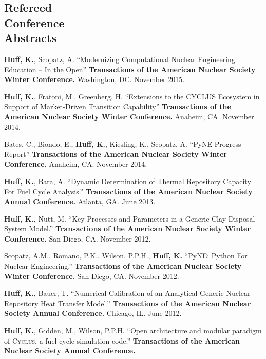 \documentclass[margin,line]{resume}
\newcommand{\Cyclus}{\textsc{Cyclus}\xspace}%
\begin{document}
\begin{resume}
    \section{\mysidestyle Refereed\\Conference\\Abstracts}
    \begin{bibenum}
      \item \textbf{Huff, K.}, Scopatz, A. ``Modernizing Computational Nuclear Engineering Education -- In the Open''
         \textbf{Transactions of the American Nuclear Society Winter Conference.}
         Washington, DC. November 2015.
      \item \textbf{Huff, K.}, Fratoni, M., Greenberg, H. ``Extensions to the CYCLUS Ecosystem in Support of Market-Driven Transition Capability''
         \textbf{Transactions of the American Nuclear Society Winter Conference.}
         Anaheim, CA. November 2014.
      \item Bates, C., Biondo, E., \textbf{Huff, K.}, Kiesling, K., Scopatz, A. ``PyNE Progress Report''
         \textbf{Transactions of the American Nuclear Society Winter Conference.}
         Anaheim, CA. November 2014.
      \item \textbf{Huff, K.}, Bara, A. ``Dynamic Determination of Thermal Repository Capacity For Fuel Cycle Analysis.''
         \textbf{Transactions of the American Nuclear Society Annual Conference.}
         Atlanta, GA. June 2013.
      \item \textbf{Huff, K.}, Nutt, M. ``Key Processes and Parameters in a Generic Clay Disposal System Model.''
         \textbf{Transactions of the American Nuclear Society Winter Conference.}
        San Diego, CA. November 2012.
      \item Scopatz, A.M., Romano, P.K., Wilson, P.P.H., \textbf{Huff, K.} ``PyNE: Python For Nuclear Engineering.''
         \textbf{Transactions of the American Nuclear Society Winter Conference.}
        San Diego, CA. November 2012.
      \item \textbf{Huff, K.}, Bauer, T. ``Numerical Calibration of an Analytical Generic Nuclear Repository Heat Transfer Model.''
         \textbf{Transactions of the American Nuclear Society Annual Conference.}
        Chicago, IL. June 2012.
      \item \textbf{Huff, K.}, Gidden, M., Wilson, P.P.H. ``Open architecture and modular paradigm of \Cyclus, a fuel cycle simulation code.''
         \textbf{Transactions of the American Nuclear Society Annual Conference.}

\end{bibenum}
\end{resume}
\end{document}
